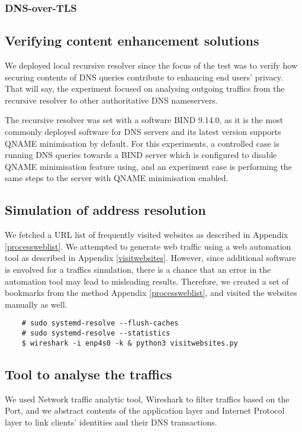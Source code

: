 \subsubsection{DNS-over-TLS}

\subsection{Verifying content enhancement solutions}
We deployed local recursive resolver since the focus of the test was to verify how securing contents of DNS queries contribute to enhancing end users' privacy. That will say, the experiment focused on analysing outgoing traffics from the recursive resolver to other authoritative DNS nameservers. 

The recursive resolver was set with a software BIND 9.14.0, as it is the most commonly deployed software for DNS servers and its latest version supports QNAME minimisation by default\cite{bind9qname}.
For this experiments, a controlled case is running DNS queries towards a BIND server which is configured to disable QNAME minimisation feature using, and an experiment case is performing the same steps to the server with QNAME minimisation enabled.

\subsection{Simulation of address resolution}\label{simulation}
We fetched a URL list of frequently visited websites as described in Appendix \ref{processweblist}.
We attempted to generate web traffic using a web automation tool as described in Appendix \ref{visitwebsites}.
However, since additional software is envolved for a traffics simulation, there is a chance that an error in the automation tool may lead to misleading results.
Therefore, we created a set of bookmarks from the method Appendix \ref{processweblist}, and visited the websites manually as well.

\begin{lstlisting}
    # sudo systemd-resolve --flush-caches
    # sudo systemd-resolve --statistics
    $ wireshark -i enp4s0 -k & python3 visitwebsites.py
\end{lstlisting}

\subsection{Tool to analyse the traffics}
We used Network traffic analytic tool, Wireshark to filter traffics based on the Port, and we abstract contents of the application layer and Internet Protocol layer to link clients' identities and their DNS transactions.